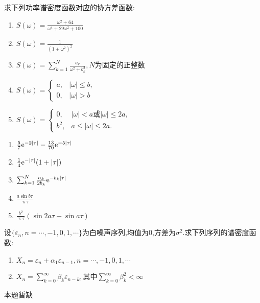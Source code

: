\begin{problem}{4.28}
求下列功率谱密度函数对应的协方差函数:
\begin{enumerate}[label=(\arabic*)]
	\item $\displaystyle S(\omega) = \frac{\omega^2+64}{\omega^4+29\omega^2+100}$
	\item $\displaystyle S(\omega) = \frac{1}{(1+\omega^2)^2}$
	\item $\displaystyle S(\omega) = \sum_{k=1}^{N}\frac{a_k}{\omega^2+b_k^2},N\text{为固定的正整数}$
	\item $\displaystyle S(\omega) =
		      \begin{cases}
			      a, & |\omega|\leqslant b, \\
			      0, & |\omega|>b
		      \end{cases}$
	\item $\displaystyle S(\omega) =
		      \begin{cases}
			      0,   & |\omega|<a\text{或}|\omega|\leqslant 2a, \\
			      b^2, & a\leqslant |\omega|\leqslant 2a.
		      \end{cases}$
\end{enumerate}
\end{problem}
\begin{solution}
	\begin{enumerate}[label=(\arabic*)]
		\item $\frac{5}{7}\mathrm{e}^{-2|\tau|}-\frac{13}{70}\mathrm{e}^{-5|\tau|}$
		\item $\frac{1}{4}\mathrm{e}^{-|\tau|}(1+|\tau|)$
		\item $\sum_{k=1}^{N}\frac{a_k}{2b_k}\mathrm{e}^{-b_k|\tau|}$
		\item $\frac{a\sin b\tau}{\uppi\tau}$
		\item $\frac{b^2}{\uppi\tau}(\sin 2a\tau -\sin a\tau)$
	\end{enumerate}
\end{solution}

\begin{problem}{4.29}
设$\{\varepsilon_n, n=\cdots ,-1,0,1,\cdots \}$为白噪声序列,均值为0,方差为$\sigma^2$.求下列序列的谱密度函数:
\begin{enumerate}[label=(\arabic*)]
	\item $X_n = \varepsilon_n + \alpha_1 \varepsilon_{n-1}, n=\cdots ,-1,0,1,\cdots $
	\item $\displaystyle X_n = \sum_{k=0}^{\infty}\beta_k \varepsilon_{n-k},\text{其中}\sum_{k=0}^{\infty}\beta_k^2<\infty$
\end{enumerate}
\end{problem}
\begin{solution}
	本题暂缺
\end{solution}

